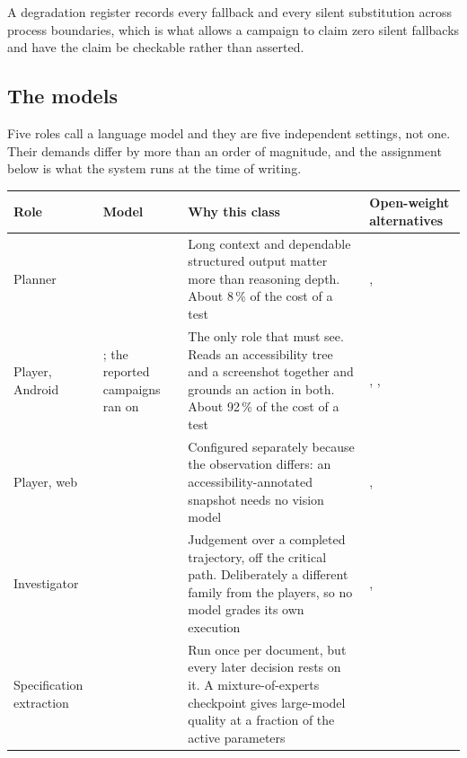 A degradation register records every fallback and every silent substitution
across process boundaries, which is what allows a campaign to claim zero silent
fallbacks and have the claim be checkable rather than asserted.

\subsection{The models}
\label{sec:models}

Five roles call a language model and they are five independent settings, not
one. Their demands differ by more than an order of magnitude, and the
assignment below is what the system runs at the time of writing.

\begin{table}[H]
  \centering\footnotesize
  \setlength{\tabcolsep}{4pt}
  \begin{tabularx}{\textwidth}{@{}>{\hsize}Y>{\hsize}Y>{\hsize}Y>{\hsize}Y@{}}
    \toprule
    Role & Model & Why this class & Open-weight alternatives \\
    \midrule
    Planner &  & Long context and dependable structured output matter more than reasoning depth. About 8\,\% of the cost of a test & ,  \\
    \addlinespace
    Player, Android & ; the reported campaigns ran on  & The only role that must see. Reads an accessibility tree and a screenshot together and grounds an action in both. About 92\,\% of the cost of a test & , ,  \\
    \addlinespace
    Player, web &  & Configured separately because the observation differs: an accessibility-annotated snapshot needs no vision model & ,  \\
    \addlinespace
    Investigator &  & Judgement over a completed trajectory, off the critical path. Deliberately a different family from the players, so no model grades its own execution & ,  \\
    \addlinespace
    Specification extraction &  & Run once per document, but every later decision rests on it. A mixture-of-experts checkpoint gives large-model quality at a fraction of the active parameters &  \\

\end{tabularx}
\end{table}
